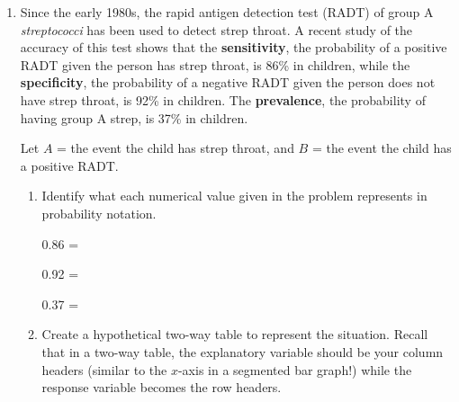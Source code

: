 \documentclass[
]{report}
\begin{document}
\begin{enumerate}
\def\labelenumi{\arabic{enumi}.}
\setcounter{enumi}{1}
\item
  Since the early 1980s, the rapid antigen detection test (RADT) of group A \emph{streptococci} has been used to detect strep throat. A recent study of the accuracy of this test shows that the \textbf{sensitivity}, the probability of a positive RADT given the person has strep throat, is 86\% in children, while the \textbf{specificity}, the probability of a negative RADT given the person does not have strep throat, is 92\% in children. The \textbf{prevalence}, the probability of having group A strep, is 37\% in children.
  \vspace{1mm}

  Let \(A\) = the event the child has strep throat, and \(B\) = the event the child has a positive RADT.
  \vspace{0.1in}

  \begin{enumerate}
  \def\labelenumii{\alph{enumii}.}
  \item
    Identify what each numerical value given in the problem represents in probability notation.
    \vspace{.1in}

    0.86 =\\
    \vspace{.1in}

    0.92 =\\
    \vspace{.1in}

    0.37 =\\
    \vspace{.1in}
  \item
    Create a hypothetical two-way table to represent the situation. Recall that in a two-way table, the explanatory variable should be your column headers (similar to the \(x\)-axis in a segmented bar graph!) while the response variable becomes the row headers.


\end{enumerate}
\end{enumerate}
\end{document}
